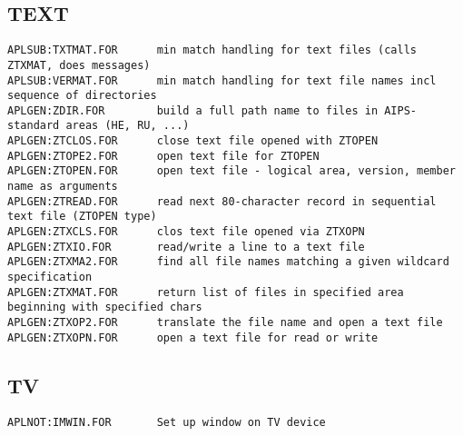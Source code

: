 \subsection{TEXT}
\begin{verbatim}
APLSUB:TXTMAT.FOR      min match handling for text files (calls ZTXMAT, does messages)
APLSUB:VERMAT.FOR      min match handling for text file names incl sequence of directories
APLGEN:ZDIR.FOR        build a full path name to files in AIPS-standard areas (HE, RU, ...)
APLGEN:ZTCLOS.FOR      close text file opened with ZTOPEN
APLGEN:ZTOPE2.FOR      open text file for ZTOPEN
APLGEN:ZTOPEN.FOR      open text file - logical area, version, member name as arguments
APLGEN:ZTREAD.FOR      read next 80-character record in sequential text file (ZTOPEN type)
APLGEN:ZTXCLS.FOR      clos text file opened via ZTXOPN
APLGEN:ZTXIO.FOR       read/write a line to a text file
APLGEN:ZTXMA2.FOR      find all file names matching a given wildcard specification
APLGEN:ZTXMAT.FOR      return list of files in specified area beginning with specified chars
APLGEN:ZTXOP2.FOR      translate the file name and open a text file
APLGEN:ZTXOPN.FOR      open a text file for read or write
\end{verbatim}
 
\subsection{TV}
\begin{verbatim}
APLNOT:IMWIN.FOR       Set up window on TV device
\end{verbatim}
 
